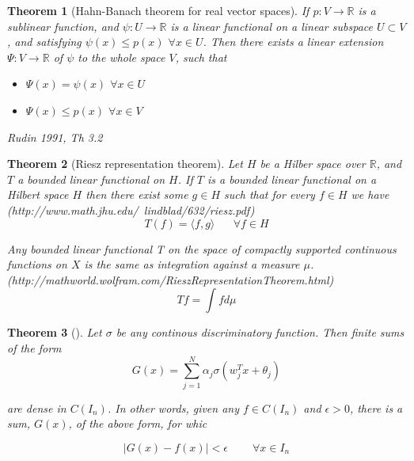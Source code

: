 \documentclass[]{article}
\newtheorem{theorem}{Theorem}[section]
\theoremstyle{definition}
\begin{document}
\begin{theorem}[Hahn-Banach theorem for real vector spaces]
	If $p : V \rightarrow \mathbb{R}$ is a sublinear function, and $\psi : U \rightarrow \mathbb{R}$ is a linear functional on a linear subspace $U \subset V$, and satisfying $\psi(x) \leq p(x)$ $\forall x \in U$.
	Then there exists a linear extension $\Psi:V \rightarrow \mathbb{R}$ of $\psi$ to the whole space $V$, such that
	
	\begin{itemize}
		\item $\Psi(x) = \psi(x)$ $\forall x \in U$
		\item $\Psi(x) \leq p(x)$ $\forall x \in V$
	\end{itemize}
	
	Rudin 1991, Th 3.2
	
\end{theorem}

\begin{theorem}[Riesz representation theorem]
	Let $H$ be a Hilber space over $\mathbb{R}$, and $T$ a bounded linear functional on $H$. If $T$ is a bounded linear functional on a Hilbert space $H$ then there exist some $g \in H$ such that for every $f \in H$ we have (http://www.math.jhu.edu/~lindblad/632/riesz.pdf)
	$$
	T(f) = \langle f,g \rangle \;\;\;\;\;\; \forall f \in H
	$$
	
	Any bounded linear functional T on the space of compactly supported continuous functions on $X$ is the same as integration against a measure $\mu$. (http://mathworld.wolfram.com/RieszRepresentationTheorem.html)
	$$
	Tf = \int f d\mu
	$$
	
\end{theorem}

\begin{theorem}[]
	Let $\sigma$ be any continous discriminatory function. Then finite sums of the form
$$
G\left(x\right) = \sum_{j=1}^{N} \alpha_j \sigma\left(w_j^Tx + \theta_j\right)
$$

are dense in $C(I_n)$. In other words, given any $f \in C(I_n)$ and $\epsilon >0$, there is a sum, $G(x)$, of the above form, for whic

$$
|G(x) - f(x)| < \epsilon \;\;\;\;\;\;\;\; \forall x \in I_n
$$
\end{theorem}
\end{document}

